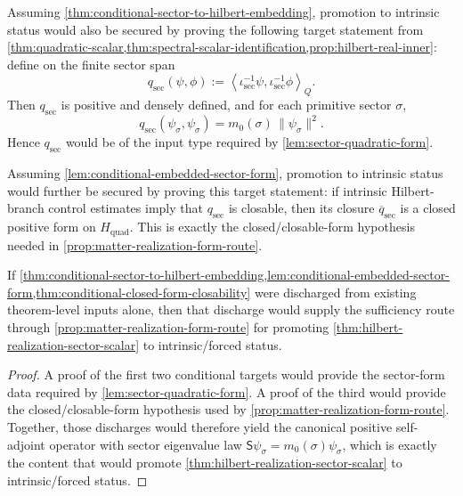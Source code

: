 \begin{lemma}
\label{lem:conditional-embedded-sector-form}
Assuming \cref{thm:conditional-sector-to-hilbert-embedding}, promotion to
intrinsic status would also be secured by proving the following target
statement from
\cref{thm:quadratic-scalar,thm:spectral-scalar-identification,prop:hilbert-real-inner}:
define on the finite sector span
\[
  q_{\mathrm{sec}}(\psi,\phi)
  :=
  \left\langle
    \iota_{\mathrm{sec}}^{-1}\psi,
    \iota_{\mathrm{sec}}^{-1}\phi
  \right\rangle_Q.
\]
Then \(q_{\mathrm{sec}}\) is positive and densely defined, and for each
primitive sector \(\sigma\),
\[
  q_{\mathrm{sec}}(\psi_\sigma,\psi_\sigma)
  =
  m_0(\sigma)\,\|\psi_\sigma\|^2.
\]
Hence \(q_{\mathrm{sec}}\) would be of the input type required by
\cref{lem:sector-quadratic-form}.
\end{lemma}

\begin{theorem}
\label{thm:conditional-closed-form-closability}
Assuming \cref{lem:conditional-embedded-sector-form}, promotion to intrinsic
status would further be secured by proving this target statement:
if intrinsic Hilbert-branch control estimates imply that
\(q_{\mathrm{sec}}\) is closable, then its closure
\(\overline q_{\mathrm{sec}}\) is a closed positive form on
\(H_{\mathrm{quad}}\).
This is exactly the closed/closable-form hypothesis needed in
\cref{prop:matter-realization-form-route}.
\end{theorem}

\begin{proposition}
\label{prop:conditional-implies-ch22-operator-target}
If
\cref{thm:conditional-sector-to-hilbert-embedding,lem:conditional-embedded-sector-form,thm:conditional-closed-form-closability}
were discharged from existing theorem-level inputs alone, then
that discharge would supply the sufficiency route through
\cref{prop:matter-realization-form-route} for promoting
\cref{thm:hilbert-realization-sector-scalar} to intrinsic/forced status.
\end{proposition}

\begin{proof}
A proof of the first two conditional targets would provide the
sector-form data required by \cref{lem:sector-quadratic-form}.
A proof of the third would provide the closed/closable-form
hypothesis used by \cref{prop:matter-realization-form-route}.
Together, those discharges would therefore yield the canonical
positive self-adjoint operator with sector eigenvalue law
\(\mathsf S\psi_\sigma=m_0(\sigma)\psi_\sigma\), which is exactly the
content that would promote
\cref{thm:hilbert-realization-sector-scalar} to intrinsic/forced
status.
\end{proof}

